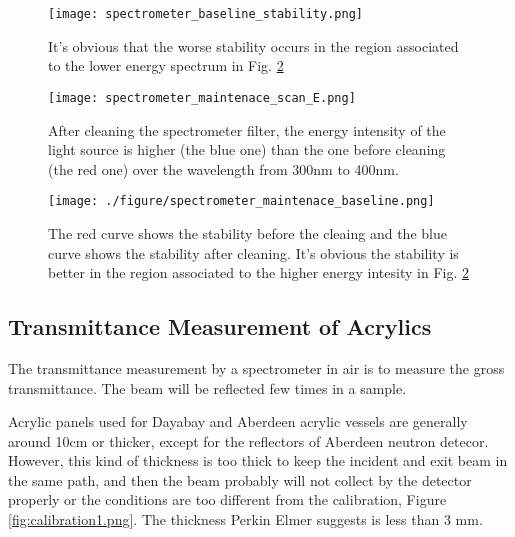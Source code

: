 \begin{figure}
    \centering
    \texttt{[image: spectrometer\_baseline\_stability.png]}
    \caption[The spectrometer baseline stability]
{It's obvious that the worse stability occurs in the region associated to the lower energy spectrum in Fig. \ref{fig:spectrometer_maintenace_scan_E.png}}
    \label{fig:spectrometer_baseline_stability.png}
    \end{figure}


\begin{figure}
    \centering
    \texttt{[image: spectrometer\_maintenace\_scan\_E.png]}
    \caption[The energy spectrum of the light source of Lambda 650]
{
After cleaning the spectrometer filter,
the energy intensity of the light source is higher (the blue one) than the one before cleaning (the red one) over the wavelength from 300nm to 400nm.
}
    \label{fig:spectrometer_maintenace_scan_E.png}
    \end{figure}


\begin{figure}
    \centering
    \texttt{[image: ./figure/spectrometer\_maintenace\_baseline.png]}
    \caption[The spectrometer baseline stability before and after cleaing the filter]
{
The red curve shows the stability before the cleaing and the blue curve shows the stability after cleaning.
It's obvious the stability is better in the region associated to the higher energy intesity in Fig. \ref{fig:spectrometer_maintenace_scan_E.png}
}
    \label{fig:spectrometer_maintenace_baseline.png}
    \end{figure}




\subsection{Transmittance Measurement of Acrylics}

The transmittance measurement by a spectrometer in air is to measure the gross transmittance.
The beam will be reflected few times in a sample.

Acrylic panels used for Dayabay and Aberdeen acrylic vessels
are generally around 10cm or thicker, except for the reflectors of Aberdeen
neutron detecor. However, this kind of thickness is too thick to
keep the incident and exit beam in the same path, and then
the beam probably will not collect by the detector properly or
the conditions are too different from the calibration, Figure \ref{fig:calibration1.png}.
The thickness Perkin Elmer suggests is less than 3 mm.



